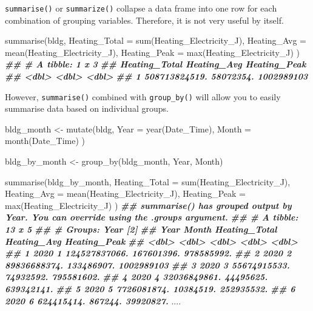 \documentclass[
]{book}
\newenvironment{Shaded}{\begin{snugshade}}{\end{snugshade}}
\newcommand{\AttributeTok}[1]{\textcolor[rgb]{0.77,0.63,0.00}{#1}}
\newcommand{\DocumentationTok}[1]{\textcolor[rgb]{0.56,0.35,0.01}{\textbf{\textit{#1}}}}
\newcommand{\FunctionTok}[1]{\textcolor[rgb]{0.00,0.00,0.00}{#1}}
\newcommand{\NormalTok}[1]{#1}
\newcommand{\OtherTok}[1]{\textcolor[rgb]{0.56,0.35,0.01}{#1}}
\begin{document}
\texttt{summarise()} or \texttt{summarize()} collapse a data frame into one row for each combination of grouping variables. Therefore, it is not very useful by itself.

\begin{Shaded}
\begin{Highlighting}[]
\FunctionTok{summarise}\NormalTok{(bldg,}
  \AttributeTok{Heating\_Total =} \FunctionTok{sum}\NormalTok{(Heating\_Electricity\_J),}
  \AttributeTok{Heating\_Avg =} \FunctionTok{mean}\NormalTok{(Heating\_Electricity\_J),}
  \AttributeTok{Heating\_Peak =} \FunctionTok{max}\NormalTok{(Heating\_Electricity\_J)}
\NormalTok{)}
\DocumentationTok{\#\# \# A tibble: 1 x 3}
\DocumentationTok{\#\#   Heating\_Total Heating\_Avg Heating\_Peak}
\DocumentationTok{\#\#           \textless{}dbl\textgreater{}       \textless{}dbl\textgreater{}        \textless{}dbl\textgreater{}}
\DocumentationTok{\#\# 1 508713824519.   58072354.   1002989103}
\end{Highlighting}
\end{Shaded}

However, \texttt{summarise()} combined with \texttt{group\_by()} will allow you to easily summarise data based on individual groups.

\begin{Shaded}
\begin{Highlighting}[]
\NormalTok{bldg\_month }\OtherTok{\textless{}{-}} \FunctionTok{mutate}\NormalTok{(bldg,}
  \AttributeTok{Year =} \FunctionTok{year}\NormalTok{(Date\_Time),}
  \AttributeTok{Month =} \FunctionTok{month}\NormalTok{(Date\_Time)}
\NormalTok{)}

\NormalTok{bldg\_by\_month }\OtherTok{\textless{}{-}} \FunctionTok{group\_by}\NormalTok{(bldg\_month, Year, Month)}

\FunctionTok{summarise}\NormalTok{(bldg\_by\_month,}
  \AttributeTok{Heating\_Total =} \FunctionTok{sum}\NormalTok{(Heating\_Electricity\_J),}
  \AttributeTok{Heating\_Avg =} \FunctionTok{mean}\NormalTok{(Heating\_Electricity\_J),}
  \AttributeTok{Heating\_Peak =} \FunctionTok{max}\NormalTok{(Heating\_Electricity\_J)}
\NormalTok{)}
\DocumentationTok{\#\# \textasciigrave{}summarise()\textasciigrave{} has grouped output by \textquotesingle{}Year\textquotesingle{}. You can override using the \textasciigrave{}.groups\textasciigrave{} argument.}
\DocumentationTok{\#\# \# A tibble: 13 x 5}
\DocumentationTok{\#\# \# Groups:   Year [2]}
\DocumentationTok{\#\#     Year Month Heating\_Total Heating\_Avg Heating\_Peak}
\DocumentationTok{\#\#    \textless{}dbl\textgreater{} \textless{}dbl\textgreater{}         \textless{}dbl\textgreater{}       \textless{}dbl\textgreater{}        \textless{}dbl\textgreater{}}
\DocumentationTok{\#\#  1  2020     1 124527837066.  167601396.   978585992.}
\DocumentationTok{\#\#  2  2020     2  89836688374.  133486907.  1002989103 }
\DocumentationTok{\#\#  3  2020     3  55674915533.   74932592.   795581602.}
\DocumentationTok{\#\#  4  2020     4  32036849861.   44495625.   639342141.}
\DocumentationTok{\#\#  5  2020     5   7726081874.   10384519.   252935532.}
\DocumentationTok{\#\#  6  2020     6    624415414.     867244.    39920827.}
\NormalTok{....}
\end{Highlighting}
\end{Shaded}
\end{document}
